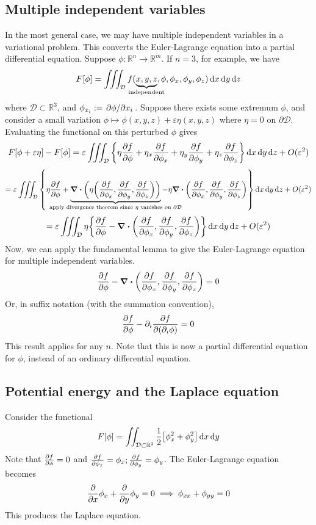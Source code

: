 \subsection{Multiple independent variables}
In the most general case, we may have multiple independent variables in a variational problem.
This converts the Euler-Lagrange equation into a partial differential equation.
Suppose \( \phi \colon \mathbb R^n \to \mathbb R^m \).
If \( n = 3 \), for example, we have
\[
	F[\phi] = \iiint_{\mathcal D} f(\underbrace{x, y, z}_{\mathclap{\text{independent}}}, \phi, \phi_x, \phi_y, \phi_z) \dd{x}\dd{y}\dd{z}
\]
where \( \mathcal D \subset \mathbb R^3 \), and \( \phi_{x_i} := \pdv*{\phi}{x_i} \).
Suppose there exists some extremum \( \phi \), and consider a small variation \( \phi \mapsto \phi(x,y,z) + \varepsilon \eta(x,y,z) \) where \( \eta = 0 \) on \( \partial \mathcal D \).
Evaluating the functional on this perturbed \( \phi \) gives
\[
	F[\phi + \varepsilon\eta] - F[\phi] = \varepsilon \iiint_{\mathcal D} \qty{ \eta \pdv{f}{\phi} + \eta_x \pdv{f}{\phi_x} + \eta_y \pdv{f}{\phi_y} + \eta_z \pdv{f}{\phi_z} } \dd{x}\dd{y}\dd{z} + O(\varepsilon^2)
\]
\[
	= \varepsilon \iiint_{\mathcal D} \qty{ \eta \pdv{f}{\phi} + \underbrace{\div(\eta\qty(\pdv{f}{\phi_x}, \pdv{f}{\phi_y}, \pdv{f}{\phi_z}))}_{\mathclap{\text{apply divergence theorem since \( \eta \) vanishes on \( \partial \mathcal D \)}}} - \eta \div(\pdv{f}{\phi_x}, \pdv{f}{\phi_y}, \pdv{f}{\phi_z}) } \dd{x}\dd{y}\dd{z} + O(\varepsilon^2)
\]
\[
	= \varepsilon \iiint_{\mathcal D} \eta \qty{ \pdv{f}{\phi} - \div(\pdv{f}{\phi_x}, \pdv{f}{\phi_y}, \pdv{f}{\phi_z}) } \dd{x}\dd{y}\dd{z} + O(\varepsilon^2)
\]
Now, we can apply the fundamental lemma to give the Euler-Lagrange equation for multiple independent variables.
\[
	\pdv{f}{\phi} - \div(\pdv{f}{\phi_x},\pdv{f}{\phi_y},\pdv{f}{\phi_z}) = 0
\]
Or, in suffix notation (with the summation convention),
\[
	\pdv{f}{\phi} - \partial_i \pdv{f}{(\partial_i \phi)} = 0
\]
This result applies for any \( n \).
Note that this is now a partial differential equation for \( \phi \), instead of an ordinary differential equation.

\subsection{Potential energy and the Laplace equation}
Consider the functional
\[
	F[\phi] = \iint_{\mathcal D \subset \mathbb R^2} \frac{1}{2} \qty[\phi_x^2 + \phi_y^2] \dd{x}\dd{y}
\]
Note that \( \pdv{f}{\phi} = 0 \) and \( \pdv{f}{\phi_x} = \phi_x; \pdv{f}{\phi_y} = \phi_y \).
The Euler-Lagrange equation becomes
\[
	\pdv{x}\phi_x + \pdv{y}\phi_y = 0 \implies \phi_{xx} + \phi_{yy} = 0
\]
This produces the Laplace equation.

